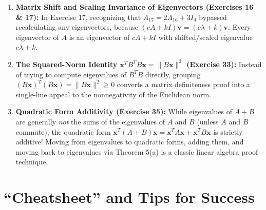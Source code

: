 \documentclass[11pt, letterpaper]{article}
\theoremstyle{definition}
\theoremstyle{remark}
\begin{document}
\begin{enumerate}
    \item \textbf{Matrix Shift and Scaling Invariance of Eigenvectors (Exercises 16 \& 17):}
    In Exercise 17, recognizing that $A_{17} = 2A_{16} + 3I_4$ bypassed recalculating any eigenvectors, because $(cA + kI)\mathbf{v} = (c\lambda + k)\mathbf{v}$. Every eigenvector of $A$ is an eigenvector of $cA + kI$ with shifted/scaled eigenvalue $c\lambda + k$.
    
    \item \textbf{The Squared-Norm Identity $\mathbf{x}^T B^T B \mathbf{x} = \|B\mathbf{x}\|^2$ (Exercise 33):}
    Instead of trying to compute eigenvalues of $B^T B$ directly, grouping $(B\mathbf{x})^T (B\mathbf{x}) = \|B\mathbf{x}\|^2 \ge 0$ converts a matrix definiteness proof into a single-line appeal to the nonnegativity of the Euclidean norm.
    
    \item \textbf{Quadratic Form Additivity (Exercise 35):}
    While eigenvalues of $A + B$ are generally \textit{not} the sums of the eigenvalues of $A$ and $B$ (unless $A$ and $B$ commute), the quadratic form $\mathbf{x}^T(A+B)\mathbf{x} = \mathbf{x}^T A\mathbf{x} + \mathbf{x}^T B\mathbf{x}$ is strictly additive! Moving from eigenvalues to quadratic forms, adding them, and moving back to eigenvalues via Theorem 5(a) is a classic linear algebra proof technique.
\end{enumerate}

\newpage
\section{``Cheatsheet'' and Tips for Success}
\end{document}
